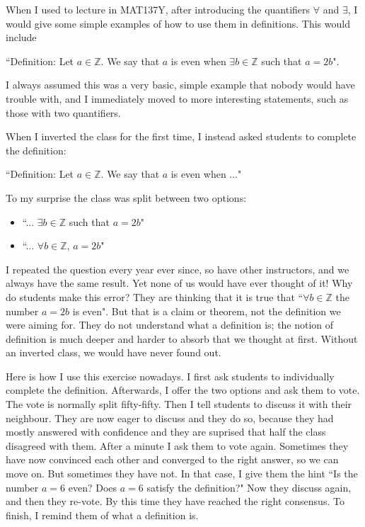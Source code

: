 \documentclass[11pt]{article}
\begin{document}
	\begin{example}
		\label{even} {\baselineskip When I used to lecture in MAT137Y, after introducing the quantifiers $\forall$ and $\exists$, I would give some simple examples of how to use them in definitions. This would include
		\begin{center}``Definition: Let $a \in \mathbb{Z}$. We say that $a$ is even when $\exists b \in \mathbb{Z}$ such that $a=2b$".\end{center}
		I always assumed this was a very basic, simple example that nobody would have trouble with, and I immediately moved to more interesting statements, such as those with two quantifiers.

		\newpage When I inverted the class for the first time, I instead asked students to complete the definition:
		\begin{center}``Definition: Let $a \in \mathbb{Z}$. We say that $a$ is even when ..."\end{center}
		To my surprise the class was split between two options: \begin{itemize}\item ``... $\exists b \in \mathbb{Z}$ such that $a=2b$"

		\item ``... $\forall b \in \mathbb{Z}$, $a=2b$"\end{itemize} I repeated the question every year ever since, so have other instructors, and we always have the same result. Yet none of us would have ever thought of it! Why do students make this error? They are thinking that it is true that ``$\forall b \in \mathbb{Z}$ the number $a=2b$ is even". But that is a claim or theorem, not the definition we were aiming for. They do not understand what a definition is; the notion of definition is much deeper and harder to absorb that we thought at first. Without an inverted class, we would have never found out.

		Here is how I use this exercise nowadays. I first ask students to individually complete the definition. Afterwards, I offer the two options and ask them to vote. The vote is normally split fifty-fifty. Then I tell students to discuss it with their neighbour. They are now eager to discuss and they do so, because they had mostly answered with confidence and they are suprised that half the class disagreed with them. After a minute I ask them to vote again. Sometimes they have now convinced each other and converged to the right answer, so we can move on. But sometimes they have not. In that case, I give them the hint ``Is the number $a=6$ even? Does $a=6$ satisfy the definition?" Now they discuss again, and then they re-vote. By this time they have reached the right consensus. To finish, I remind them of what a definition is. }
	\end{example}
\end{document}

